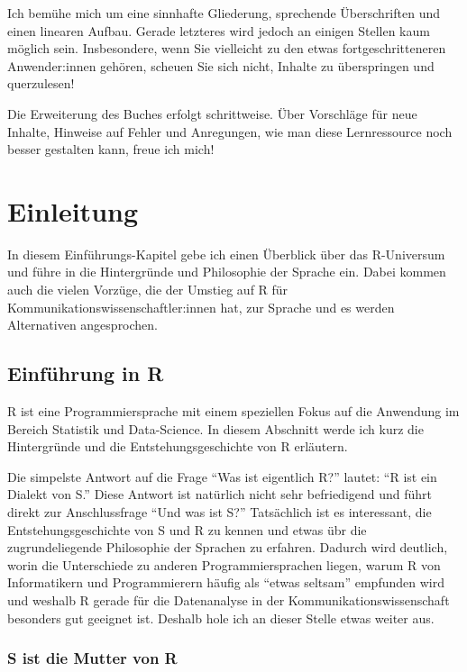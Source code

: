 \documentclass[
]{book}
\begin{document}
Ich bemühe mich um eine sinnhafte Gliederung, sprechende Überschriften und einen linearen Aufbau. Gerade letzteres wird jedoch an einigen Stellen kaum möglich sein. Insbesondere, wenn Sie vielleicht zu den etwas fortgeschritteneren Anwender:innen gehören, scheuen Sie sich nicht, Inhalte zu überspringen und querzulesen!

Die Erweiterung des Buches erfolgt schrittweise. Über Vorschläge für neue Inhalte, Hinweise auf Fehler und Anregungen, wie man diese Lernressource noch besser gestalten kann, freue ich mich!

\hypertarget{intro}{%
\chapter{Einleitung}\label{intro}}

In diesem Einführungs-Kapitel gebe ich einen Überblick über das R-Universum und führe in die Hintergründe und Philosophie der Sprache ein. Dabei kommen auch die vielen Vorzüge, die der Umstieg auf R für Kommunikationswissenschaftler:innen hat, zur Sprache und es werden Alternativen angesprochen.

\hypertarget{einfuxfchrung-in-r}{%
\section{Einführung in R}\label{einfuxfchrung-in-r}}

R ist eine Programmiersprache mit einem speziellen Fokus auf die Anwendung im Bereich Statistik und Data-Science. In diesem Abschnitt werde ich kurz die Hintergründe und die Entstehungsgeschichte von R erläutern.

Die simpelste Antwort auf die Frage ``Was ist eigentlich R?'' lautet: ``R ist ein Dialekt von S.'' \citep{Peng_2020}
Diese Antwort ist natürlich nicht sehr befriedigend und führt direkt zur Anschlussfrage
``Und was ist S?'' Tatsächlich ist es interessant, die Entstehungsgeschichte von S und R zu kennen und etwas übr die zugrundeliegende Philosophie der Sprachen zu erfahren.
Dadurch wird deutlich, worin die Unterschiede zu anderen Programmiersprachen liegen, warum
R von Informatikern und Programmierern häufig als ``etwas seltsam'' empfunden wird und weshalb R gerade
für die Datenanalyse in der Kommunikationswissenschaft besonders gut geeignet ist.
Deshalb hole ich an dieser Stelle etwas weiter aus.

\hypertarget{s-ist-die-mutter-von-r}{%
\subsection{S ist die Mutter von R}\label{s-ist-die-mutter-von-r}}
\end{document}
